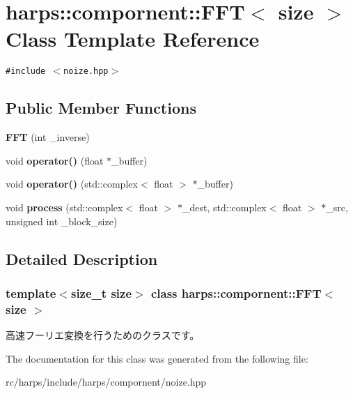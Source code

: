 \section{harps::compornent::FFT$<$ size $>$ Class Template Reference}
\label{classharps_1_1compornent_1_1FFT}
{\tt \#include $<$noize.hpp$>$}

\subsection*{Public Member Functions}
\begin{CompactItemize}
\item 
\textbf{FFT} (int \_\-inverse)\label{classharps_1_1compornent_1_1FFT_f9e163248a4a1effeb45be7aacf18824}

\item 
void \textbf{operator()} (float $\ast$\_\-buffer)\label{classharps_1_1compornent_1_1FFT_ead57ca53e62bf176a43f9b4c2b356e7}

\item 
void \textbf{operator()} (std::complex$<$ float $>$ $\ast$\_\-buffer)\label{classharps_1_1compornent_1_1FFT_138cf479685812d1d792d91ab0f40e01}

\item 
void \textbf{process} (std::complex$<$ float $>$ $\ast$\_\-dest, std::complex$<$ float $>$ $\ast$\_\-src, unsigned int \_\-block\_\-size)\label{classharps_1_1compornent_1_1FFT_dc2aeef5b010a13811af33d2b7fceabf}

\end{CompactItemize}


\subsection{Detailed Description}
\subsubsection*{template$<$size\_\-t size$>$ class harps::compornent::FFT$<$ size $>$}

高速フーリエ変換を行うためのクラスです。 

The documentation for this class was generated from the following file:\begin{CompactItemize}
\item 
rc/harps/include/harps/compornent/noize.hpp\end{CompactItemize}

